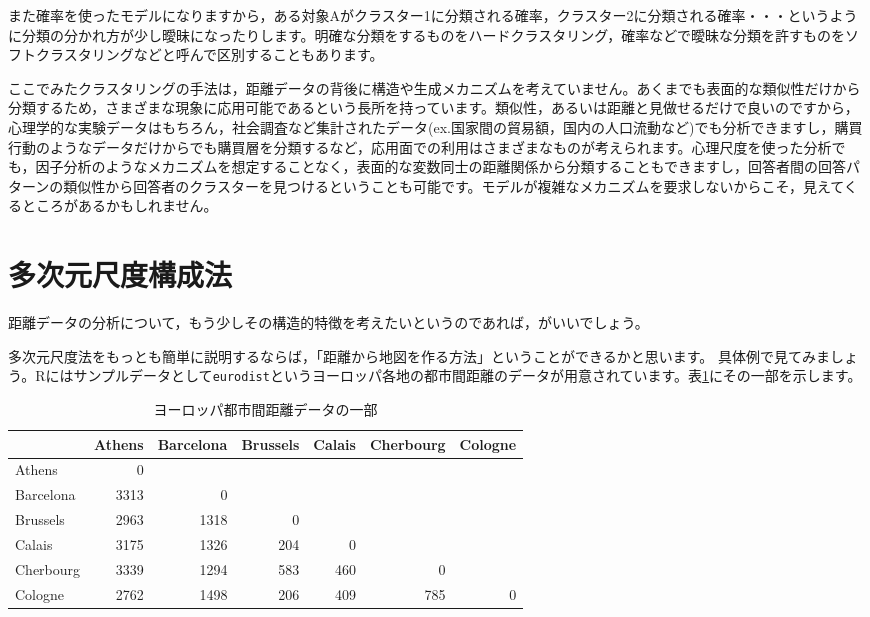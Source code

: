 \documentclass{ltjsbook}
\begin{document}
また確率を使ったモデルになりますから，ある対象Aがクラスター1に分類される確率，クラスター2に分類される確率・・・というように分類の分かれ方が少し曖昧になったりします。明確な分類をするものをハードクラスタリング，確率などで曖昧な分類を許すものをソフトクラスタリングなどと呼んで区別することもあります。


ここでみたクラスタリングの手法は，距離データの背後に構造や生成メカニズムを考えていません。あくまでも表面的な類似性だけから分類するため，さまざまな現象に応用可能であるという長所を持っています。類似性，あるいは距離と見做せるだけで良いのですから，心理学的な実験データはもちろん，社会調査など集計されたデータ(ex.国家間の貿易額，国内の人口流動など)でも分析できますし，購買行動のようなデータだけからでも購買層を分類するなど，応用面での利用はさまざまなものが考えられます。心理尺度を使った分析でも，因子分析のようなメカニズムを想定することなく，表面的な変数同士の距離関係から分類することもできますし，回答者間の回答パターンの類似性から回答者のクラスターを見つけるということも可能です。モデルが複雑なメカニズムを要求しないからこそ，見えてくるところがあるかもしれません。


\section{多次元尺度構成法}
距離データの分析について，もう少しその構造的特徴を考えたいというのであれば，がいいでしょう。

多次元尺度法をもっとも簡単に説明するならば，「距離から地図を作る方法」ということができるかと思います。
具体例で見てみましょう。Rにはサンプルデータとして\texttt{eurodist}というヨーロッパ各地の都市間距離のデータが用意されています。表\ref{tbl::15_01}にその一部を示します。

\begin{table}[ht]
	\centering
	\caption{ヨーロッパ都市間距離データの一部}
	\begin{tabular}{l|rrrrrr}
		          & Athens & Barcelona & Brussels & Calais & Cherbourg & Cologne \\
		\hline
		Athens    & 0      &           &          &        &           &         \\
		Barcelona & 3313   & 0         &          &        &           &         \\
		Brussels  & 2963   & 1318      & 0        &        &           &         \\
		Calais    & 3175   & 1326      & 204      & 0      &           &         \\
		Cherbourg & 3339   & 1294      & 583      & 460    & 0         &         \\
		Cologne   & 2762   & 1498      & 206      & 409    & 785       & 0       \\
		\hline
	\end{tabular}
	\label{tbl::15_01}
\end{table}
\end{document}
